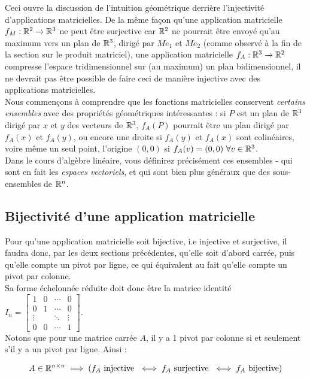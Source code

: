 \noindent Ceci ouvre la discussion de l'intuition géométrique derrière l'injectivité d'applications matricielles. De la même façon qu'une application matricielle $f_M : \mathbb{R}^2 \to \mathbb{R}^3$ ne peut être surjective car $\mathbb{R}^2$ ne pourrait être envoyé qu'au maximum vers un plan de $\mathbb{R}^3$, dirigé par $Me_1$ et $Me_2$ (comme observé à la fin de la section sur le produit matriciel), une application matricielle $f_A: \mathbb{R}^3 \to \mathbb{R}^2$ compresse l'espace tridimensionnel sur (au maximum) un plan bidimensionnel, il ne devrait pas être possible de faire ceci de manière injective avec des applications matricielles.\\

\noindent Nous commençons à comprendre que les fonctions matricielles conservent \textit{certains ensembles} avec des propriétés géométriques intéressantes : si $P$ est un plan de $\mathbb{R}^3$ dirigé par $x$ et $y$ des vecteurs de $\mathbb{R}^3$, $f_A(P)$ pourrait être un plan dirigé par $f_A(x)$ et $f_A(y)$, ou encore une droite si $f_A(y)$ et $f_A(x)$ sont colinéaires, voire même un seul point, l'origine $(0,0)$ si $f_A(v) = (0,0)\ \forall v \in \mathbb{R}^3$.\\

\noindent Dans le cours d'algèbre linéaire, vous définirez précisément ces ensembles - qui sont en fait les \textit{espaces vectoriels}, et qui sont bien plus généraux que des sous-ensembles de $\mathbb{R}^n$.

\subsection{Bijectivité d'une application matricielle}
\noindent Pour qu'une application matricielle soit bijective, i.e injective et surjective, il faudra donc, par les deux sections précédentes, qu'elle soit d'abord carrée, puis qu'elle compte un pivot par ligne, ce qui équivalent au fait qu'elle compte un pivot par colonne.\\

\noindent Sa forme échelonnée réduite doit donc être la matrice identité $I_n = \begin{bmatrix}
1 & 0 & \cdots & 0 \\
0 & 1 & \cdots & 0 \\
\vdots & & \ddots& \vdots \\
0 & 0 & \cdots & 1
\end{bmatrix}$.\\
Notons que pour une matrice carrée $A$, il y a 1 pivot par colonne si et seulement s'il y a un pivot par ligne. Ainsi :
\begin{boxthm}
$$A \in \mathbb{R}^{n\times n} \implies \left(f_A \text{ injective } \iff f_A \text{ surjective } \iff f_A \text{ bijective}\right)
$$
\end{boxthm}

